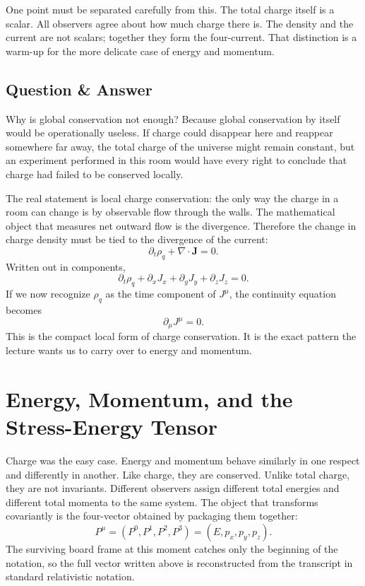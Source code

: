 One point must be separated carefully from this. The total charge itself is a scalar. All observers agree about how much charge there is. The density and the current are not scalars; together they form the four-current. That distinction is a warm-up for the more delicate case of energy and momentum.

\subsection{Question \& Answer}

Why is global conservation not enough? Because global conservation by itself would be operationally useless. If charge could disappear here and reappear somewhere far away, the total charge of the universe might remain constant, but an experiment performed in this room would have every right to conclude that charge had failed to be conserved locally.

The real statement is local charge conservation: the only way the charge in a room can change is by observable flow through the walls. The mathematical object that measures net outward flow is the divergence. Therefore the change in charge density must be tied to the divergence of the current:
\begin{equation}
\partial_t\rho_q+\nabla\cdot\mathbf J=0.
\end{equation}
Written out in components,
\begin{equation}
\partial_t\rho_q+\partial_x J_x+\partial_y J_y+\partial_z J_z=0.
\end{equation}
If we now recognize \(\rho_q\) as the time component of \(J^\mu\), the continuity equation becomes
\begin{equation}
\partial_\mu J^\mu=0.
\end{equation}
This is the compact local form of charge conservation. It is the exact pattern the lecture wants us to carry over to energy and momentum.

\section{Energy, Momentum, and the Stress-Energy Tensor}

Charge was the easy case. Energy and momentum behave similarly in one respect and differently in another. Like charge, they are conserved. Unlike total charge, they are not invariants. Different observers assign different total energies and different total momenta to the same system. The object that transforms covariantly is the four-vector obtained by packaging them together:
\begin{equation}
P^\mu=(P^0,P^1,P^2,P^3)=(E,p_x,p_y,p_z).
\end{equation}
The surviving board frame at this moment catches only the beginning of the notation, so the full vector written above is reconstructed from the transcript in standard relativistic notation.

